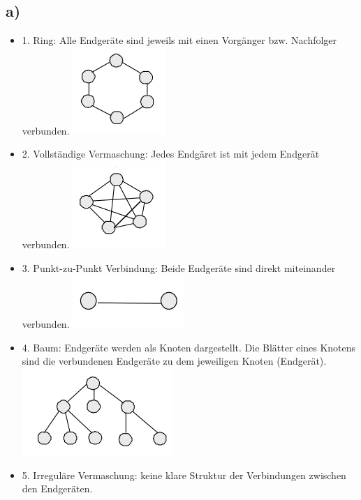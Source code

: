 \documentclass[a4paper,12pt]{scrartcl}
\begin{document}
\subsection{a)}
\begin{itemize}
	\item 1. Ring: Alle Endgeräte sind jeweils mit einen Vorgänger bzw. Nachfolger verbunden.
	\linebreak\includegraphics{./images/Blatt-1_Ring}
	\item 2. Vollständige Vermaschung: Jedes Endgäret ist mit jedem Endgerät verbunden.
	\linebreak\includegraphics{./images/Blatt-1_Vollstaendige-Vermaschung}
	\item 3. Punkt-zu-Punkt Verbindung: Beide Endgeräte sind direkt miteinander verbunden.
	\linebreak\includegraphics{./images/Blatt-1_PunktZuPunkt-Verbindung}
	\item 4. Baum: Endgeräte werden als Knoten dargestellt. Die Blätter eines Knotens sind die verbundenen Endgeräte zu dem jeweiligen Knoten (Endgerät).
	\linebreak\includegraphics{./images/Blatt-1_Baum}
	\item 5. Irreguläre Vermaschung: keine klare Struktur der Verbindungen zwischen den Endgeräten.

\end{itemize}
\end{document}
